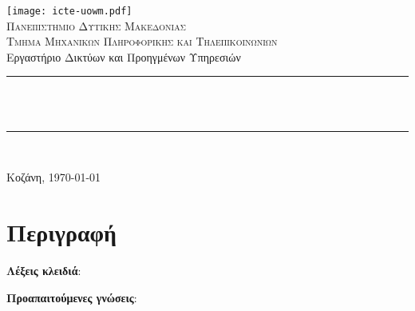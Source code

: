 \documentclass{EdipyLabs} %
\begin{document}
	
\begin{titlepage}
	\centering %
	\texttt{[image: icte-uowm.pdf]}\\[1cm]
	
	\textsc{\Huge Πανεπιστημιο Δυτικησ Μακεδονιασ}\\[0.5cm] %
	\textsc{\Large Τμημα Μηχανικων Πληροφορικησ και Τηλεπικοινωνιων}\\[0.5cm] %
	\large{Εργαστήριο Δικτύων και Προηγμένων Υπηρεσιών}\\[0.5cm] %
	
	\rule{\linewidth}{0.5mm}\\[0.25cm]
	{\LARGE\bfseries \LabTitle}\\ %
	\rule{\linewidth}{0.5mm}\\[1.25cm]
	
	
	\vfill %
	
	{\large Κοζάνη, \today} 
	
\end{titlepage}

\section*{Περιγραφή}
\textbf{Λέξεις κλειδιά}: \LabDescription \par
\textbf{Προαπαιτούμενες γνώσεις}: \LabPrerequisites\par
\renewcommand{\baselinestretch}{\dnormalspacing}
\small
\titlespacing{\section}{0cm}{1cm}{0cm}
\tableofcontents
\titlespacing{\section}{0cm}{1cm}{0.25cm}	
\listoffigures
\titlespacing{\section}{0cm}{0.25cm}{-0.125cm}
\titlespacing{\subsection}{0cm}{0.25cm}{-0.125cm}
\titlespacing{\subsubsection}{0cm}{0.25cm}{-0.125cm}
\renewcommand{\baselinestretch}{\dnormalspacing}\normalsize
\newpage
\end{document}
